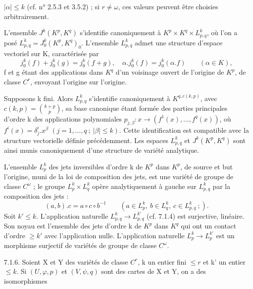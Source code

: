 
$|\alpha|\leq k$ (cf. n° 2.5.3 et 3.5.2) ; si $r\ne\omega$, ces valeurs peuvent être choisies arbitrairement.

L'ensemble $J^k(K^p,K^q)$ s'identifie canoniquement à $K^p\times K^q\times L_{p,q}^k$, où l'on a posé $L_{p,q}^k=J_0^k(K^p,K^q)_0$. L'ensemble $L_{p,q}^k$ admet une structure d'espace vectoriel sur K, caractérisée par
\[
j_0^k(f)+j_0^k(g)=j_0^k(f+g),\quad\alpha.j_0^k(f)=j_0^k(\alpha.f)\qquad(\alpha\in K),
\]
f et g étant des applications dans $K^q$ d'un voisinage ouvert de l'origine de $K^p$, de classe $C^r$, envoyant l'origine sur l'origine.

Supposons k fini. Alors $L_{p,q}^k$ s'identifie canoniquement à $K^{q,c(k,p)}$, avec $c(k,p)=\binom{k+p}{p}$, sa base canonique étant formée des parties principales d'ordre k des applications polynomiales $p_{j,\beta}:x\longrightarrow(f^1(x),\ldots,f^q(x))$, où $f^i(x)=\delta_j^i.x^\beta$ $(j=1,\ldots,q\ ;\ |\beta|\leq k)$. Cette identification est compatible avec la structure vectorielle définie précédemment. Les espaces $L_{p,q}^k$ et $J^k(K^p,K^q)$ sont ainsi munis canoniquement d'une structure de variété analytique.

L'ensemble $L_p^k$ des jets inversibles d'ordre k de $K^p$ dans $K^p$, de source et but l'origine, muni de la loi de composition des jets, est une variété de groupe de classe $C^\omega$ ; le groupe $L_p^k\times L_q^k$ opère analytiquement à gauche sur $L_{p,q}^k$ par la composition des jets :
\[
(a,b).c=a\circ c\circ b^{-1}\qquad(a\in L_p^k,\ b\in L_q^k,\ c\in L_{p,q}^k\ ;).
\]
Soit $k'\leq k$. L'application naturelle $L_{p,q}^k\longrightarrow L_{p,q}^{k'}$ (cf. 7.1.4) est surjective, linéaire. Son noyau est l'ensemble des jets d'ordre k de $K^p$ dans $K^q$ qui ont un contact d'ordre $\geq k'$ avec l'application nulle. L'application naturelle $L_p^k\longrightarrow L_p^{k'}$ est un morphisme surjectif de variétés de groupe de classe $C^\omega$.

7.1.6. Soient X et Y des variétés de classe $C^r$, k un entier fini $\leq r$ et k' un entier $\leq k$. Si $(U,\varphi,p)$ et $(V,\psi,q)$ sont des cartes de X et Y, on a des isomorphismes
